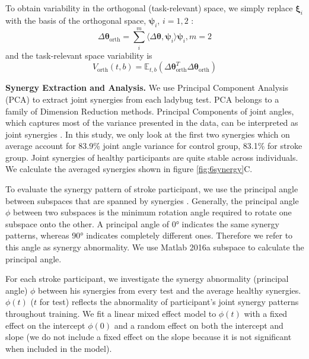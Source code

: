 To obtain variability in the orthogonal (task-relevant) space, we simply replace $ \bm{\xi}_i $ with the basis of the orthogonal space, $ \bm{\psi}_i $, $ i= 1,2 $  :
	\begin{equation}
	\Delta\bm{\theta}_{\text{orth}} = \sum_i^m \langle \Delta\bm{\theta}, \bm{\psi}_i \rangle \bm{\psi}_i, m=2
	\end{equation}
and the task-relevant space variability is
	\begin{equation}\label{eqn:taskvar}
	V_{\text{orth}}(t,b) = \mathbb{E}_{t,b} (\Delta\bm{\theta}_{\text{orth}}^T\Delta\bm{\theta}_{\text{orth}})
	\end{equation}

\textbf{Synergy Extraction and Analysis.}
We use Principal Component Analysis (PCA) to extract joint synergies from each ladybug test.
PCA belongs to a family of Dimension Reduction methods.
Principal Components of joint angles, which captures most of the variance presented in the data, can be interpreted as joint synergies \cite{}.
In this study, we only look at the first two synergies which on average account for 83.9\% joint angle variance for control group, 83.1\% for stroke group.
Joint synergies of healthy participants are quite stable across individuals.
We calculate the averaged synergies shown in figure \ref{fig:6synergy}C.

To evaluate the synergy pattern of stroke participant, we use the principal angle \cite{} between subspaces that are spanned by synergies \cite{}.
Generally, the principal angle $ \phi $ between two subspaces is the minimum rotation angle required to rotate one subspace onto the other.
A principal angle of \ang{0} indicates the same synergy patterns, whereas \ang{90} indicates completely different ones.
Therefore we refer to this angle as synergy abnormality.
We use Matlab 2016a \textsf{subspace} \cite{} to calculate the principal angle. 

For each stroke participant, we investigate the synergy abnormality (principal angle) $ \phi $ between his synergies from every test and the average healthy synergies.
$ \phi(t) $ ($ t $ for test) reflects the abnormality of participant's joint synergy patterns throughout training. 
We fit a linear mixed effect model to $ \phi(t) $ with a fixed effect on the intercept $ \phi(0) $ and a random effect on both the intercept and slope (we do not include a fixed effect on the slope because it is not significant when included in the model).

